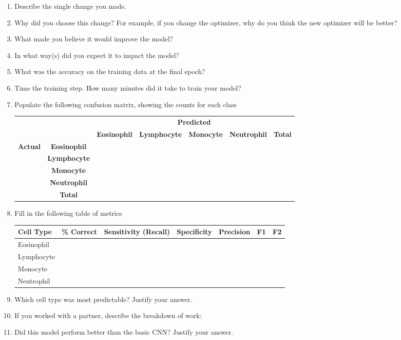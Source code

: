 \documentclass[11pt]{article}
\renewcommand\:{\colon} %
\begin{document}
\begin{enumerate}
\item Describe the single change you made.  
\item Why did you choose this change?  For example, if you change the optimizer, why do you think the new optimizer will be better?
\item What made you believe it would improve the model?  
\item In what way(s) did you expect it to impact the model?
\item What was the accuracy on the training data at the final epoch? 

\item Time the training step. How many minutes did it take to train your model?

\item Populate the following confusion matrix, showing the counts for each class

\begin{tabular}{|l|c|c|c|c|c|c|} \hline
\multicolumn{2}{|c|}{ } &  \multicolumn{5}{|c|}{\textbf{Predicted}}  \\ \cline{3-7}
\multicolumn{2}{|c|}{ } & \textbf{Eosinophil} & \textbf{Lymphocyte} & \textbf{Monocyte} & \textbf{Neutrophil} & \textbf{Total}   \\ \hline
\multirow{ 4}{*}{\textbf{Actual}}& \textbf{Eosinophil}  & & & & & \\ \cline{2-7}
& \textbf{Lymphocyte}    & & & & & \\ \cline{2-7}
& \textbf{Monocyte}    & & & & & \\ \cline{2-7}
& \textbf{Neutrophil}   & & & & &\\ \cline{2-7}
& \textbf{Total} & & & & & \\ \hline
\end{tabular}

\item Fill in the following table of metrics


\begin{tabular}{|l|c|c|c|c|c|c|} \hline
\textbf{Cell Type} & \textbf{\% Correct} & \textbf{Sensitivity (Recall)} & \textbf{Specificity} & \textbf{Precision} & \textbf{F1} & \textbf{F2} \\ \hline
Eosinophil & & & & & & \\ \hline
Lymphocyte &  & & & & & \\ \hline
Monocyte &  & & & & & \\ \hline
Neutrophil & & & & & & \\ \hline
\end{tabular}
\item Which cell type was most predictable? Justify your answer.


\item If you worked with a partner, describe the breakdown of work:


\item Did this model perform better than the basic CNN? Justify your answer.

\end{enumerate}
\end{document}

